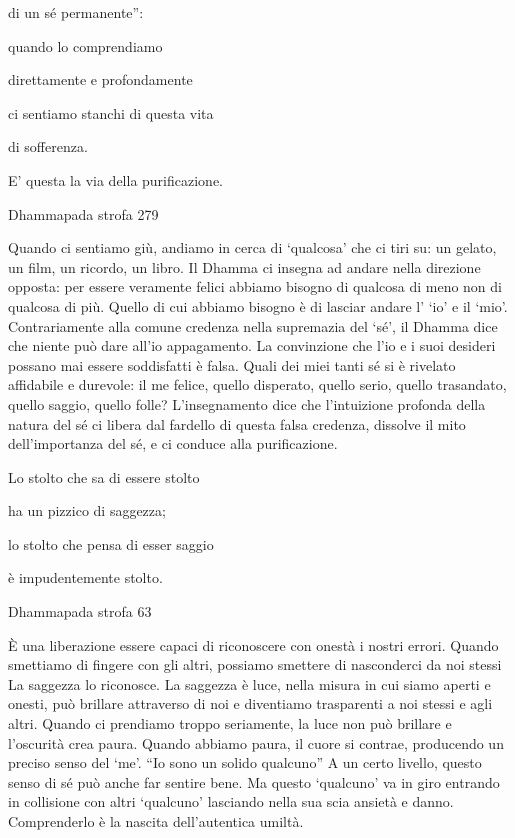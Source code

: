 \documentclass[a4paper,portrait,12pt]{article}
\begin{document}
di un s\'{e} permanente'':


quando lo comprendiamo


direttamente e profondamente


ci sentiamo stanchi di questa vita


di sofferenza.


E' questa la via della purificazione.





Dhammapada strofa 279


\newpage



Quando ci sentiamo giù, andiamo in cerca di `qualcosa' che ci tiri su: un gelato, un film, un ricordo, un libro. Il Dhamma ci insegna ad andare nella direzione opposta: per essere veramente felici abbiamo bisogno di qualcosa di meno non di qualcosa di più. Quello di cui abbiamo bisogno \`{e} di lasciar andare l' `io' e il `mio'. Contrariamente alla comune credenza nella supremazia del `s\'{e}', il Dhamma dice che niente pu\`{o} dare all'io appagamento. La convinzione che l'io e i suoi desideri possano mai essere soddisfatti \`{e} falsa. Quali dei miei tanti s\'{e} si \`{e} rivelato affidabile e durevole: il me felice, quello disperato, quello serio, quello trasandato, quello saggio, quello folle? L'insegnamento dice che l'intuizione profonda della natura del s\'{e} ci libera dal fardello di questa falsa credenza, dissolve il mito dell'importanza del s\'{e}, e ci conduce alla purificazione.


\newpage



Lo stolto che sa di essere stolto


ha un pizzico di saggezza;


lo stolto che pensa di esser saggio


\`{e} impudentemente stolto.





Dhammapada strofa 63


\newpage



\`{E} una liberazione essere capaci di riconoscere con onest\`{a} i nostri errori. Quando smettiamo di fingere con gli altri, possiamo smettere di nasconderci da noi stessi La saggezza lo riconosce. La saggezza \`{e} luce, nella misura in cui siamo aperti e onesti, pu\`{o} brillare attraverso di noi e diventiamo trasparenti a noi stessi e agli altri. Quando ci prendiamo troppo seriamente, la luce non pu\`{o} brillare e l'oscurit\`{a} crea paura. Quando abbiamo paura, il cuore si contrae, producendo un preciso senso del `me'. ``Io sono un solido qualcuno'' A un certo livello, questo senso di s\'{e} pu\`{o} anche far sentire bene. Ma questo `qualcuno' va in giro entrando in collisione con altri `qualcuno' lasciando nella sua scia ansiet\`{a} e danno. Comprenderlo \`{e} la nascita dell'autentica umilt\`{a}.
\end{document}
